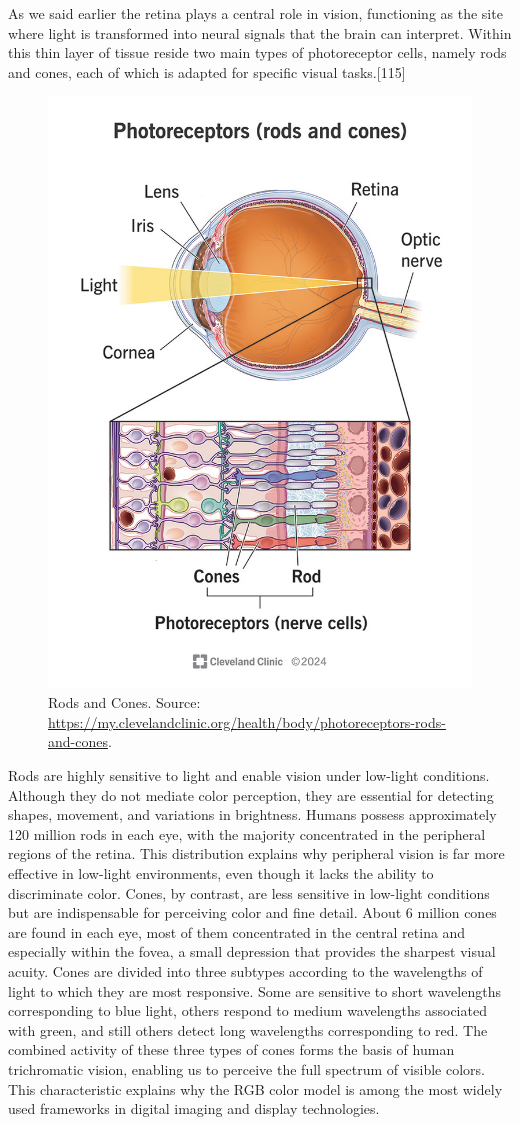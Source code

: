 \documentclass[12pt]{report}
\begin{document}
As we said earlier the retina plays a central role in vision, functioning as the site where light is transformed into neural signals that the brain can interpret. 
Within this thin layer of tissue reside two main types of photoreceptor cells, namely rods and cones, each of which is adapted for specific visual tasks.[115]

\begin{figure}[ht]
    \centering
    \includegraphics[width = 0.6
    \textwidth]{Images/Theory/rods_cones.jpg}
    \caption{Rods and Cones. Source: \url{https://my.clevelandclinic.org/health/body/photoreceptors-rods-and-cones}.}
    \label{fig:rodscones}
\end{figure}

Rods are highly sensitive to light and enable vision under low-light conditions. 
Although they do not mediate color perception, they are essential for detecting shapes, movement, and variations in brightness. 
Humans possess approximately 120 million rods in each eye, with the majority concentrated in the peripheral regions of the retina. 
This distribution explains why peripheral vision is far more effective in low-light environments, even though it lacks the ability to discriminate color.
Cones, by contrast, are less sensitive in low-light conditions but are indispensable for perceiving color and fine detail.
About 6 million cones are found in each eye, most of them concentrated in the central retina and especially within the fovea, a small depression that provides the sharpest visual acuity.
Cones are divided into three subtypes according to the wavelengths of light to which they are most responsive.
Some are sensitive to short wavelengths corresponding to blue light, others respond to medium wavelengths associated with green, and still others detect long wavelengths corresponding to red. 
The combined activity of these three types of cones forms the basis of human trichromatic vision, enabling us to perceive the full spectrum of visible colors.
This characteristic explains why the RGB color model is among the most widely used frameworks in digital imaging and display technologies.
\end{document}
